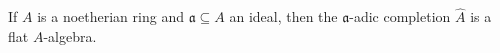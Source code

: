 If $A$ is a noetherian ring and $\mathfrak{a} \subseteq A$ an ideal, then the $\mathfrak{a}$-adic completion $\hat{A}$ is a flat $A$-algebra.
